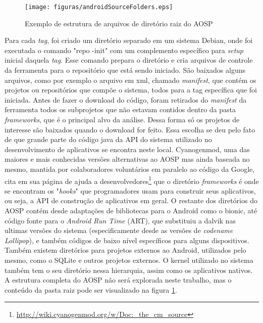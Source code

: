\begin{figure}[!htb]
\centering
\texttt{[image: figuras/androidSourceFolders.eps]}
\caption{Exemplo de estrutura de arquivos de diretório raiz do AOSP}
\label{androidSourceFolders}
\end{figure}

Para cada \textit{tag}, foi criado um diretório separado em um sistema Debian, onde foi executada o comando "repo -init" com um complemento específico para \textit{setup} inicial daquela \textit{tag}. Esse comando prepara o diretório e cria arquivos de controle da ferramenta para o repositório que está sendo iniciado. São baixados alguns arquivos, como por exemplo o arquivo em xml, chamado \textit{manifest}, que contém os projetos ou repositórios que compõe o sistema, todos para a tag específica que foi iniciada. Antes de fazer o download do código, foram retirados do \textit{manifest} da ferramenta todos os subprojetos que não estavam contidos dentro da pasta \textit{frameworks}, que é o principal alvo da análise. Dessa forma só os projetos de interesse são baixados quando o download for feito. Essa escolha se deu pelo fato de que grande parte do código java da API do sistema utilizado no desenvolvimento de aplicativos se encontra neste local. Cyanogenmod, uma das maiores e mais conhecidas versões alternativas ao AOSP mas ainda baseada no mesmo, mantida por colaboradores voluntários em paralelo ao código da Google, cita em sua página de ajuda a desenvolvedores\footnote{\url{http://wiki.cyanogenmod.org/w/Doc:_the_cm_source}}  que o diretório \textit{frameworks} é onde se encontram os "\textit{hooks}" que programadores usam para construir seus aplicativos, ou seja, a API de construção de aplicativos em geral. O restante dos diretórios do AOSP contém desde adaptações de bibliotecas para o Android como o bionic, até código fonte para o \textit{Android Run Time} (ART), que substituiu a dalvik nas ultimas versões do sistema (especificamente desde as versões de \textit{codename Lollipop}), e também códigos de baixo nível específicos para alguns dispositivos. Também existem diretórios para projetos externos ao Android, utilizados pelo mesmo, como o SQLite e outros projetos externos. O kernel utilizado no sistema também tem o seu diretório nessa hierarquia, assim como os aplicativos nativos. A estrutura completa do AOSP não será explorada neste trabalho, mas o conteúdo da pasta raiz pode ser visualizado na figura \ref{androidSourceFolders}.

